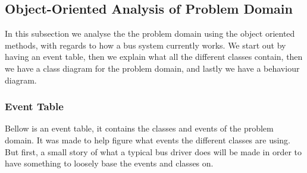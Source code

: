 \subsection{Object-Oriented Analysis of Problem Domain}
In this subsection we analyse the the problem domain using the object oriented methods, with regards to how a bus system currently works. We start out by having an event table, then we explain what all the different classes contain, then we have a class diagram for the problem domain, and lastly we have a behaviour diagram.

\subsubsection{Event Table}

Bellow is an event table, it contains the classes and events of the problem domain. It was made to help figure what events the different classes are using. But first, a small story of what a typical bus driver does will be made in order to have something to loosely base the events and classes on.

